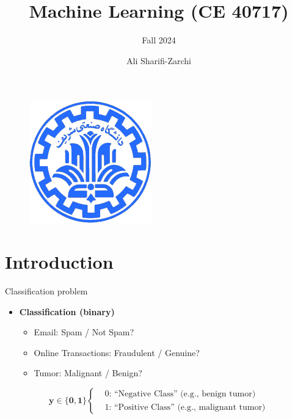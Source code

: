 \documentclass[serif, aspectratio=169]{beamer}
\author{Ali Sharifi-Zarchi}
\title{Machine Learning (CE 40717)}
\subtitle{Fall 2024}
\institute{
    CE Department \\
    Sharif University of Technology
}
\begin{document}
\begin{frame}
    \titlepage
    \vspace*{-0.6cm}
    \begin{figure}[htpb]
        \begin{center}
            \includegraphics[keepaspectratio, scale=0.25]{pic/sharif-main-logo.png}
        \end{center}
    \end{figure}
    \vfill %
    \vspace{-0.35cm}
\end{frame}

\begin{frame}    
\tableofcontents[sectionstyle=show,
subsectionstyle=show/shaded/hide,
subsubsectionstyle=show/shaded/hide]
\end{frame}


\section{Introduction}

\begin{frame}{Classification problem}
    \begin{itemize}
        \item \textbf{Classification (binary)}
        \begin{itemize}
            \item Email: Spam / Not Spam?
            \item Online Transactions: Fraudulent / Genuine?
            \item Tumor: Malignant / Benign?
        \end{itemize}
    \end{itemize}
    
    
    \[
               \mathbf{y \in \{0, 1\} } \begin{cases}
                    & \text{0: ``Negative Class'' (e.g., benign tumor)} \\
                     & \text{1: ``Positive Class'' (e.g., malignant tumor)}
                \end{cases}
            \]
\end{frame}
\end{document}
